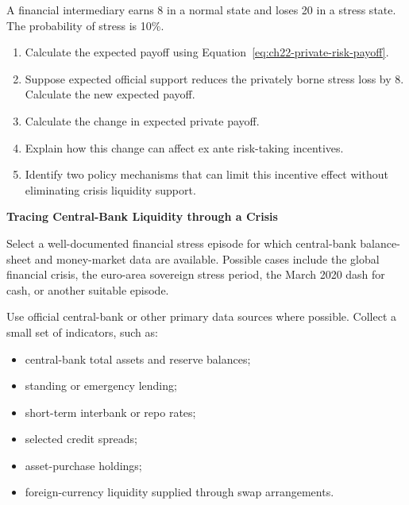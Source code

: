 \begin{enumerate}
A financial intermediary earns 8 in a normal state and loses 20 in a stress state. The probability of stress is 10\%.

\begin{enumerate}

\item Calculate the expected payoff using Equation~\eqref{eq:ch22-private-risk-payoff}.

\item Suppose expected official support reduces the privately borne stress loss by 8. Calculate the new expected payoff.

\item Calculate the change in expected private payoff.

\item Explain how this change can affect ex ante risk-taking incentives.

\item Identify two policy mechanisms that can limit this incentive effect without eliminating crisis liquidity support.

\end{enumerate}

\end{enumerate}





\textbf{Tracing Central-Bank Liquidity through a Crisis}

Select a well-documented financial stress episode for which central-bank balance-sheet and money-market data are available. Possible cases include the global financial crisis, the euro-area sovereign stress period, the March 2020 dash for cash, or another suitable episode.

Use official central-bank or other primary data sources where possible. Collect a small set of indicators, such as:

\begin{itemize}

\item central-bank total assets and reserve balances;

\item standing or emergency lending;

\item short-term interbank or repo rates;

\item selected credit spreads;

\item asset-purchase holdings;

\item foreign-currency liquidity supplied through swap arrangements.

\end{itemize}

